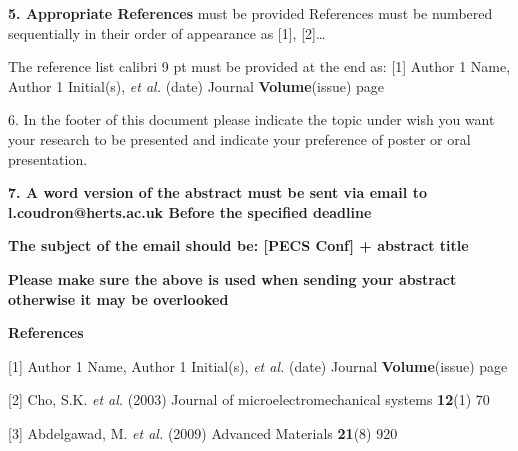 \documentclass{article}
\begin{document}
\textbf{5. Appropriate References} must be provided References must be numbered sequentially in their order of appearance as [1], [2]…

The reference list calibri 9 pt must be provided at the end as: [1] Author 1 Name, Author 1 Initial(s), \textit{et al.} (date) Journal \textbf{Volume}(issue) page

6. In the footer of this document please indicate the topic under wish you want your research to be presented and indicate your preference of poster or oral presentation. 

\textbf{7. A word version of the abstract must be sent via email to l.coudron@herts.ac.uk Before the specified deadline}

\textbf{The subject of the email should be: [PECS Conf] + abstract title}

\textbf{Please make sure the above is used when sending your abstract otherwise it may be overlooked }


\vspace{3mm}
\textbf{References}

[1] Author 1 Name, Author 1 Initial(s), \textit{et al.} (date) Journal \textbf{Volume}(issue) page

[2] Cho, S.K. \textit{et al.} (2003) Journal of microelectromechanical systems \textbf{12}(1) 70

[3] Abdelgawad, M. \textit{et al.} (2009) Advanced Materials \textbf{21}(8) 920


\end{document}
